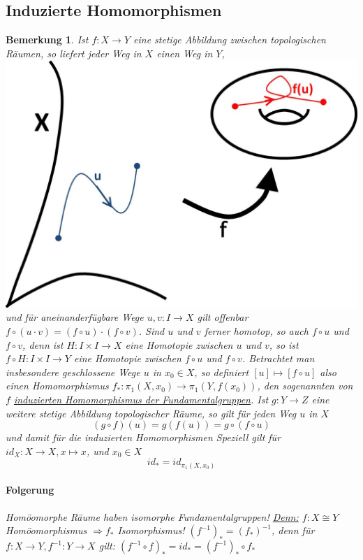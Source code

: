 \documentclass[a4paper,11pt,notitlepage]{report}
\newtheorem{remark}{Bemerkung}[chapter]
\begin{document}
\subsection{Induzierte Homomorphismen}
\begin{remark}
	Ist $f \colon X \rightarrow Y$ eine stetige Abbildung zwischen topologischen Räumen, so liefert jeder Weg in $X$ einen Weg in $Y$, \includegraphics[scale=0.4]{images/Weg_stetige_Abbildung.jpg} und für aneinanderfügbare Wege $u,v \colon I \rightarrow X$ gilt offenbar $f \circ (u \cdot v) = (f \circ u) \cdot (f \circ v)$.
	\newline
	Sind $u$ und $v$ ferner homotop, so auch $f \circ u$ und $f \circ v$, denn ist $H \colon I \times I \rightarrow X$ eine Homotopie zwischen $u$ und $v$, so ist $f \circ H \colon I \times I \rightarrow Y$ eine Homotopie zwischen $f \circ u$ und $f \circ v$.
	\newline
	Betrachtet man insbesondere geschlossene Wege $u$ in $x_0 \in X$, so definiert $[u] \mapsto [f \circ u]$ also einen Homomorphismus $f_* \colon \pi_1(X,x_0) \rightarrow \pi_1(Y, f(x_0))$, den sogenannten von $f$ \underline{induzierten Homomorphismus der Fundamentalgruppen}.
	\newline
	Ist $g \colon Y \rightarrow Z$ eine weitere stetige Abbildung topologischer Räume, so gilt für jeden Weg $u$ in $X$
	$$(g \circ f) (u) = g(f(u)) = g \circ (f \circ u)$$
	und damit für die induzierten Homomorphismen 
	 \newline
	Speziell gilt für $id_X \colon X \rightarrow X, x \mapsto x$, und $x_0 \in X$
	$$id_* = id_{\pi_1(X,x_0)}$$
	
	\paragraph{Folgerung} Homöomorphe Räume haben isomorphe Fundamentalgruppen!
	\underline{Denn:} $f \colon X \cong Y$ Homöomorphismus $\Rightarrow f_*$ Isomorphismus!
	\newline
	$(f^{-1})_*=(f_*)^{-1}$, denn für
	$f \colon X \rightarrow Y, f^{-1} \colon Y \rightarrow X$ gilt:\newline
	$(f^{-1} \circ f)_* = id_* = (f^{-1})_* \circ f_*$
\end{remark}
\end{document}
